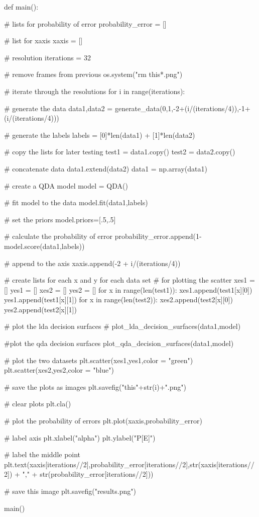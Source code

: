 \documentclass{article}
\begin{document}
{\begin{python}
def main():

	# lists for probability of error
	probability_error = []

	# list for xaxis
	xaxis = []

	# resolution
	iterations = 32

	# remove frames from previous
	os.system("rm this*.png")

	# iterate through the resolutions
	for i in range(iterations):

		# generate the data
		data1,data2 = generate_data(0,1,-2+(i/(iterations/4)),-1+(i/(iterations/4)))

		# generate the labels
		labels = [0]*len(data1) + [1]*len(data2)

		# copy the lists for later testing
		test1 = data1.copy()
		test2 = data2.copy()

		# concatenate data
		data1.extend(data2)
		data1 = np.array(data1)

		# create a QDA model
		model = QDA()

		# fit model to the data
		model.fit(data1,labels)

		# set the priors
		model.priors=[.5,.5]

		# calculate the probability of error
		probability_error.append(1-model.score(data1,labels))

		# append to the axis
		xaxis.append(-2 + i/(iterations/4))

		# create lists for each x and y for each data set
		# for plotting the scatter
		xes1 = []
		yes1 = []
		xes2 = []
		yes2 = []
		for x in range(len(test1)):
			xes1.append(test1[x][0])
			yes1.append(test1[x][1])
		for x in range(len(test2)):
			xes2.append(test2[x][0])
			yes2.append(test2[x][1])
		
		# plot the lda decision surfaces
		# plot_lda_decision_surfaces(data1,model)
		
		#plot the qda decision surfaces
		plot_qda_decision_surfaces(data1,model)

		# plot the two datasets
		plt.scatter(xes1,yes1,color = "green")
		plt.scatter(xes2,yes2,color = "blue")

		# save the plots as images
		plt.savefig("this"+str(i)+".png")

		# clear plots
		plt.cla()
	
	# plot the probability of errors
	plt.plot(xaxis,probability_error)

	# label axis
	plt.xlabel("alpha")
	plt.ylabel("P[E]")

	# label the middle point
	plt.text(xaxis[iterations//2],probability_error[iterations//2],str(xaxis[iterations//2]) + "," + str(probability_error[iterations//2]))
	
	# save this image
	plt.savefig("results.png")


main()

	
	
\end{python}
}
\end{document}
